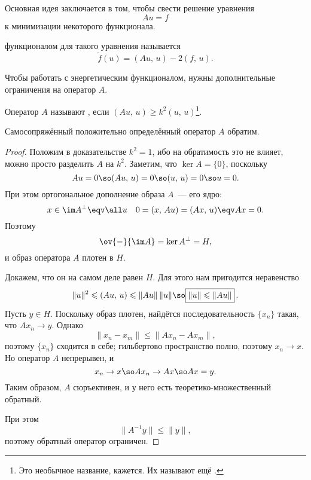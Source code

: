 \documentclass{trlnotes}
\begin{document}
    Основная идея заключается в том, чтобы свести решение уравнения
    \[
        Au = f
    \]
    к минимизации некоторого функционала. 

    \begin{de}
         функционалом для такого уравнения называется
        \[
            \tilde{f}(u) = ( Au, \, u ) - 2(f, \, u).
        \]
    \end{de}

    Чтобы работать с энергетическим функционалом, нужны дополнительные ограничения на оператор $A$.

    \begin{de}
        Оператор $A$ называют , если $(Au, \, u) \geqslant k^2 (u, \, u)$\footnote{Это необычное название, кажется. Их называют ещё .}.
    \end{de}

    \begin{st} \label{st:semi-bound-inv}
        Самосопряжённый положительно определённый оператор $A$ обратим.
        \begin{proof}
            Положим в доказательстве $k^2 = 1$, ибо на обратимость это не влияет, можно просто разделить $A$ на $k^2$. Заметим, что $\ker A = \{0\}$, поскольку
            \[
                Au = 0 \so (Au, \, u) = 0 \so (u, \, u) = 0 \so u = 0.
            \]
            При этом ортогональное дополнение образа $A$~--- его ядро:
            \[
                x \in \im A^{\perp} \eqv \all u \quad 0 = (x, \, Au) = (Ax, \, u) \eqv Ax = 0.
            \]
            Поэтому
            \[
                \ov{-}{\im A} = \ker A^{\perp} = H,
            \]
            и образ оператора $A$ плотен в $H$.

            Докажем, что он на самом деле равен $H$. Для этого нам пригодится неравенство
            \[
                \|u\|^2 \leqslant (Au, \, u) \leqslant \|Au\| \, \|u\| \so \boxed{\|u\| \leqslant \|Au\|}\,.
            \]
            Пусть $y \in H$. Поскольку образ плотен, найдётся последовательность $\{x_n\}$ такая, что $Ax_n \to y$. Однако
            \[
                \|x_n - x_m\| \leqslant \|Ax_n - Ax_m\|,
            \]
            поэтому $\{x_n\}$ сходится в себе; гильбертово пространство полно, поэтому $x_n \to x$. Но оператор $A$ непрерывен, и
            \[ 
                x_n \to x \so A x_n \to Ax \so Ax = y.
            \]
            Таким образом, $A$ сюръективен, и у него есть теоретико-множественный обратный.

            При этом
            \[
                \|A^{-1}y\| \leqslant \|y\|, 
            \]
            поэтому обратный оператор ограничен.


        \end{proof}
    \end{st}
\end{document}
